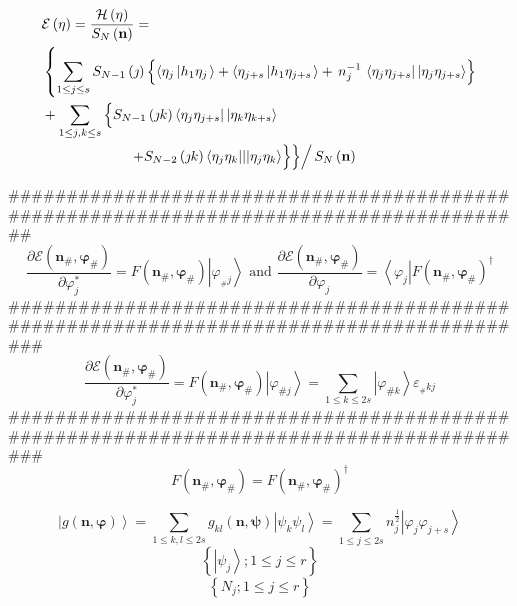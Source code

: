 \documentclass[aps,preprint]{revtex4}%
\begin{document}
\begin{align*}
&  \mathcal{E}\left(  \mathbf{\eta}\right)  =\frac{\mathcal{H}\left(
\mathbf{\eta}\right)  }{S_{N}\left(  \mathbf{n}\right)  }=\\
&  \left\{  \sum_{1\leq j\leq s}S_{N-1}\left(  \jmath\right)  \left\{
\overset{}{\left\langle \eta_{j}\left\vert h_{1}\eta_{j}\right.  \right\rangle
+\left\langle \eta_{j+s}\left\vert h_{1}\eta_{j+s}\right.  \right\rangle
}+\,n_{j}^{-1}\,\left\langle \eta_{j}\eta_{j+s}\right\vert \left\vert \eta
_{j}\eta_{j+s}\right\rangle \right\}  \right. \\
&  +\sum_{1\leq j,k\leq s}\left\{  \overset{}{S_{N-1}\left(  \jmath k\right)
\left\langle \eta_{j}\eta_{j+s}\right\vert \left\vert \eta_{k}\eta
_{k+s}\right\rangle }\right. \\
&  \qquad\qquad\qquad\left.  \left.  \left.  +\overset{}{S_{N-2}\left(  \jmath
k\right)  \left\langle \eta_{j}\eta_{k}|||\eta_{j}\eta_{k}\right\rangle
}\right\}  \right\}  \right/  S_{N}\left(  \mathbf{n}\right)
\end{align*}


########################################################################################%
\[
\frac{\partial\mathcal{E}\left(  \mathbf{n}_{\#}\mathbf{,\varphi}_{\#}\right)
}{\partial\varphi_{j}^{\ast}}=F\left(  \mathbf{n}_{\#}\mathbf{,\varphi}%
_{\#}\right)  \left\vert \varphi_{_{\#}j}\right\rangle \text{ and }%
\frac{\partial\mathcal{E}\left(  \mathbf{n}_{\#}\mathbf{,\varphi}_{\#}\right)
}{\partial\varphi_{j}}=\left\langle \varphi_{j}\right\vert F\left(
\mathbf{n}_{\#}\mathbf{,\varphi}_{\#}\right)  ^{\dagger}%
\]
#########################################################################################%
\[
\frac{\partial\mathcal{E}\left(  \mathbf{n}_{\#}\mathbf{,\varphi}_{\#}\right)
}{\partial\varphi_{j}^{\ast}}=F\left(  \mathbf{n}_{\#}\mathbf{,\varphi}%
_{\#}\right)  \left\vert \varphi_{\#j}\right\rangle =\sum_{1\leq k\leq
2s}\left\vert \varphi_{\#k}\right\rangle \varepsilon_{_{\#}kj}%
\]
#########################################################################################%
\[
F\left(  \mathbf{n}_{\#}\mathbf{,\varphi}_{\#}\right)  =F\left(
\mathbf{n}_{\#}\mathbf{,\varphi}_{\#}\right)  ^{\dagger}%
\]
%

\[
\left\vert g\left(  \mathbf{n},\mathbf{\varphi}\right)  \right\rangle
=\sum_{1\leq k,l\leq2s}g_{kl}\left(  \mathbf{n},\mathbf{\psi}\right)
\left\vert \psi_{k}\psi_{l}\right\rangle =\sum_{1\leq j\leq2s}n_{j}^{\frac
{1}{2}}\left\vert \varphi_{j}\varphi_{j+s}\right\rangle
\]%
\[
\left\{  \left\vert \psi_{j}\right\rangle ;1\leq j\leq r\right\}
\]%
\[
\left\{  N_{j};1\leq j\leq r\right\}
\]
\end{document}
